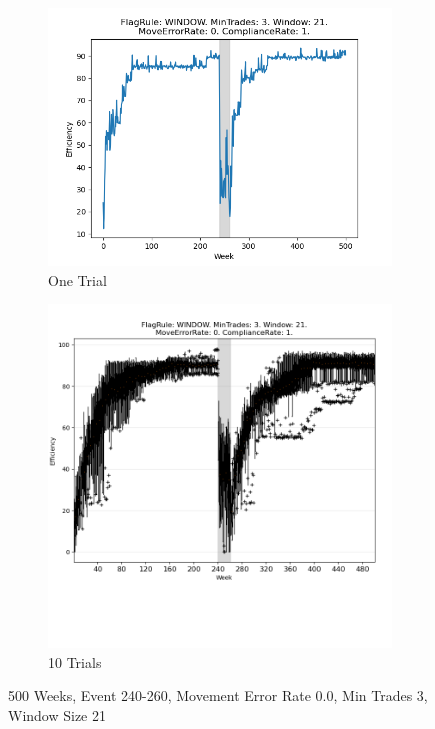 \documentclass{article}%
\begin{document}
%


\begin{figure}[!htb]%
\begin{subfigure}[b]{0.45\linewidth}%
\includegraphics[width=\linewidth]{2057fr_WINDOW_mt_3_ws_21_er_0_cr_1_t1.png}%
\caption{One Trial}%
\end{subfigure}%
\begin{subfigure}[b]{0.45\linewidth}%
\includegraphics[clip,width=\linewidth,trim=0 4cm 0 0]{2057fr_WINDOW_mt_3_ws_21_er_0_cr_1_t10.png}%
\caption{10 Trials}%
\end{subfigure}%
\caption{500 Weeks, Event 240{-}260, Movement Error Rate 0.0, Min Trades 3, Window Size 21}%
\end{figure}
\end{document}
